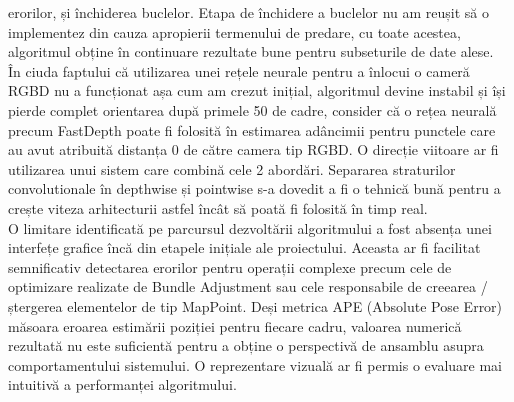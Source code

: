 \documentclass[12pt,a4paper]{report}
\begin{document}
erorilor, și închiderea buclelor. Etapa de închidere a buclelor nu am reușit să o 
implementez din cauza apropierii termenului de predare, cu toate acestea, algoritmul
obține în continuare rezultate bune pentru subseturile de date alese. \\
În ciuda faptului că utilizarea unei rețele neurale pentru a înlocui o cameră 
RGBD nu a funcționat așa cum am crezut inițial, algoritmul devine instabil și 
își pierde complet orientarea după primele 50 de cadre, consider că o rețea 
neurală precum FastDepth poate fi folosită în estimarea adâncimii pentru 
punctele care au avut atribuită distanța 0 de către camera tip RGBD.\@   
O direcție viitoare ar fi utilizarea unui sistem care combină cele 2 
abordări. Separarea straturilor convolutionale în depthwise și pointwise s-a dovedit
a fi o tehnică bună pentru a crește viteza arhitecturii astfel încât să poată fi
folosită în timp real. \\
O limitare identificată pe parcursul dezvoltării algoritmului a fost absența unei interfețe grafice
încă din etapele inițiale ale proiectului. Aceasta ar fi facilitat semnificativ
detectarea erorilor pentru operații complexe precum cele de optimizare realizate de 
Bundle Adjustment sau cele responsabile de creearea / ștergerea elementelor de tip MapPoint. 
Deși metrica APE (Absolute Pose Error) măsoara eroarea estimării poziției pentru fiecare cadru, 
valoarea numerică rezultată nu este suficientă pentru a obține o perspectivă de ansamblu asupra
comportamentului sistemului. O reprezentare vizuală ar fi permis o evaluare mai intuitivă a 
performanței algoritmului.
\end{document}

